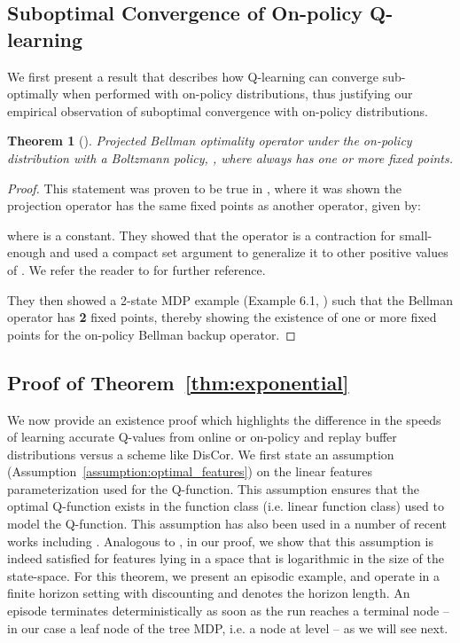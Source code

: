 \documentclass[jmlr]{article}
\newtheorem{theorem}{Theorem}[section]
\begin{document}
\subsection{Suboptimal Convergence of On-policy Q-learning}
We first present a result that describes how Q-learning can converge sub-optimally when performed with on-policy distributions, thus justifying our empirical observation of suboptimal convergence with on-policy distributions. 
\begin{theorem}[\cite{farias_fixed_points}]
Projected Bellman optimality operator under the on-policy distribution  with a Boltzmann policy, , where  always has one or more fixed points.
\end{theorem}
\begin{proof}
This statement was proven to be true in \cite{farias_fixed_points}, where it was shown the projection operator  has the same fixed points as another operator,  given by:

where  is a constant. They showed that the operator  is a contraction for small-enough  and used a compact set argument to generalize it to other positive values of . We refer the reader to \cite{farias_fixed_points} for further reference.

They then showed a 2-state MDP example (Example 6.1, \cite{farias_fixed_points}) such that the Bellman operator  has \textbf{2} fixed points, thereby showing the existence of one or more fixed points for the on-policy Bellman backup operator.  
\end{proof}









\subsection{Proof of Theorem~\ref{thm:exponential}}

We now provide an existence proof which highlights the difference in the speeds of learning accurate Q-values from online or on-policy and replay buffer distributions versus a scheme like DisCor. 
We first state an assumption (Assumption~\ref{assumption:optimal_features}) on the linear features parameterization used for the Q-function. This assumption ensures that the optimal Q-function exists in the function class (i.e. linear function class) used to model the Q-function. This assumption has also been used in a number of recent works including \cite{du2020is}. Analogous to \cite{du2020is}, in our proof, we show that this assumption is indeed satisfied for features lying in a space that is logarithmic in the size of the state-space. For this theorem, we present an episodic example, and operate in a finite horizon setting with discounting  and  denotes the horizon length. An episode terminates deterministically as soon as the run reaches a terminal node -- in our case a leaf node of the tree MDP, i.e. a node at level  -- as we will see next.
\end{document}
